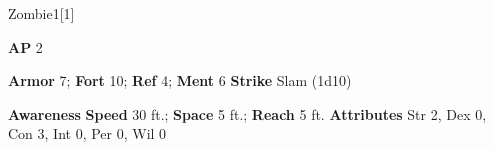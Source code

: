 \begin{monsection}{Zombie}{1}[1]
\vspace{-1em}\vspace{-1em}
\begin{spellcontent}
\begin{spelltargetinginfo}
{\textbf{AP} 2}

\pari \textbf{Armor} 7;
\textbf{Fort} 10;
\textbf{Ref} 4;
\textbf{Ment} 6
\pari \textbf{Strike} Slam  (1d10)



\end{spelltargetinginfo}


\end{spellcontent}

\begin{monsterfooter}
\pari \textbf{Awareness} 
\pari \textbf{Speed} 30 ft.;
\textbf{Space} 5 ft.;
\textbf{Reach} 5 ft.
\pari \textbf{Attributes}
Str 2,
Dex 0,
Con 3,
Int 0,
Per 0,
Wil 0
\end{monsterfooter}
\end{monsection}



